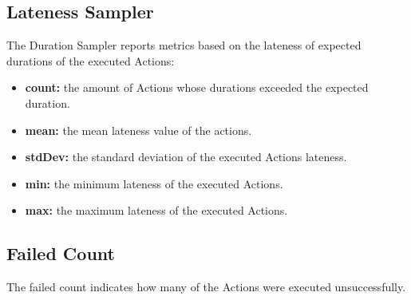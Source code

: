 \subsection{Lateness Sampler}
The Duration Sampler reports metrics based on the lateness of expected durations of the executed Actions:
\begin{itemize}
	\item \textbf{count:} the amount of Actions whose durations exceeded the expected duration.
	\item \textbf{mean:} the mean lateness value of the actions.
	\item \textbf{stdDev:} the standard deviation of the executed Actions lateness.
	\item \textbf{min:} the minimum lateness of the executed Actions.
	\item \textbf{max:} the maximum lateness of the executed Actions.
\end{itemize}

\subsection{Failed Count}
The failed count indicates how many of the Actions were executed unsuccessfully.



